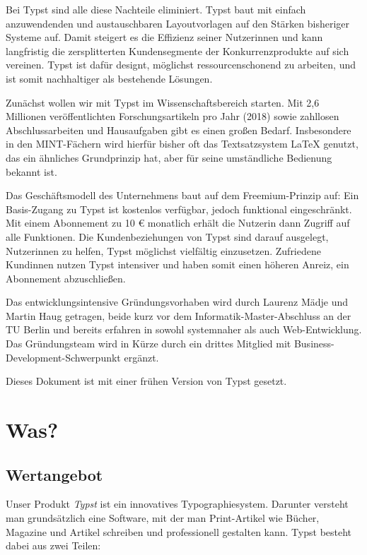 \documentclass[11pt, a4paper]{article}
\newcommand{\gender}{\raisebox{-.25em}{*}}
\let\oldsection\section
\renewcommand\section{\clearpage\oldsection}
\newcommand{\cited}[1]{\marginsymbol{\textbf{↗} #1}}
\newcommand{\marginsymbol}[1] {\protect\marginsymbolhelper{#1}}
\newcommand{\marginsymbolhelper}[1] {\tabto*{-1cm}\makebox[0cm]{#1}\tabto*{\TabPrevPos}}
\begin{document}
Bei Typst sind alle diese Nachteile eliminiert. Typst baut mit einfach anzuwendenden und austauschbaren Layoutvorlagen auf den Stärken bisheriger Systeme auf. Damit steigert es die Effizienz seiner Nutzer\gender{}innen und kann langfristig die zersplitterten Kundensegmente der Konkurrenzprodukte auf sich vereinen. Typst ist dafür designt, möglichst ressourcenschonend zu arbeiten, und ist somit nachhaltiger als bestehende Lösungen.

Zunächst wollen wir mit Typst im Wissenschaftsbereich starten. Mit \cited{1} 2,6 Millionen veröffentlichten Forschungsartikeln pro Jahr (2018) sowie zahllosen Abschlussarbeiten und Hausaufgaben gibt es einen großen Bedarf. Insbesondere in den MINT-Fächern wird hierfür bisher oft das Textsatzsystem LaTeX genutzt, das ein ähnliches Grundprinzip hat, aber für seine umständliche Bedienung bekannt ist.

Das Geschäftsmodell des Unternehmens baut auf dem Freemium-Prinzip auf: Ein Basis-Zugang zu Typst ist kostenlos verfügbar, jedoch funktional eingeschränkt. Mit einem Abonnement zu 10 € monatlich erhält die\gender{} Nutzer\gender{}in dann Zugriff auf alle Funktionen. Die Kundenbeziehungen von Typst sind darauf ausgelegt, Nutzer\gender{}innen zu helfen, Typst möglichst vielfältig einzusetzen. Zufriedene Kund\gender{}innen nutzen Typst intensiver und haben somit einen höheren Anreiz, ein Abonnement abzuschließen.

Das entwicklungsintensive Gründungsvorhaben wird durch Laurenz Mädje und Martin Haug getragen, beide kurz vor dem Informatik-Master-Abschluss an der TU Berlin und bereits erfahren in sowohl systemnaher als auch Web-Entwicklung. Das Gründungsteam wird in Kürze durch ein drittes Mitglied mit Business-Development-Schwerpunkt ergänzt.

Dieses Dokument ist mit einer frühen Version von Typst gesetzt.


\section*{Was?}
\subsection*{Wertangebot}

Unser Produkt \emph{Typst} ist ein innovatives Typographiesystem. Darunter versteht man grundsätzlich eine Software, mit der man Print-Artikel wie Bücher, Magazine und Artikel schreiben und professionell gestalten kann. Typst besteht dabei aus zwei Teilen:
\end{document}
